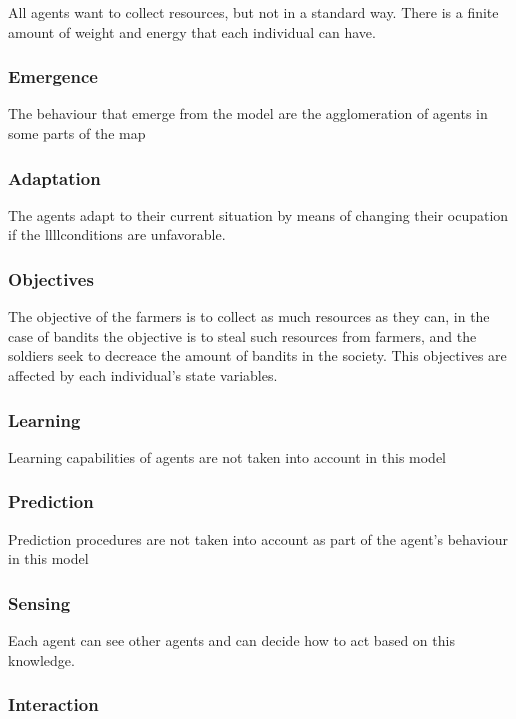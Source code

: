 \documentclass{wscpaperproc}
\theoremstyle{wsc}
\begin{document}
All agents want to collect resources, but not in a standard way. There is a
finite amount of weight and energy that each individual can have.

\subsubsection{Emergence}

The behaviour that emerge from the model are the agglomeration of agents in
some parts of the map

\subsubsection{Adaptation}

The agents adapt to their current situation by means of changing their
ocupation if the llllconditions are unfavorable.

\subsubsection{Objectives}

The objective of the farmers is to collect as much resources as they can, in
the case of bandits the objective is to steal such resources from farmers, and
the soldiers seek to decreace the amount of bandits in the society. This
objectives are affected by each individual's state variables.

\subsubsection{Learning}

Learning capabilities of agents are not taken into account in this model

\subsubsection{Prediction}

Prediction procedures are not taken into account as part of the agent's
behaviour in this model

\subsubsection{Sensing}

Each agent can see other agents and can decide how to act based on this
knowledge.

\subsubsection{Interaction}
\end{document}
